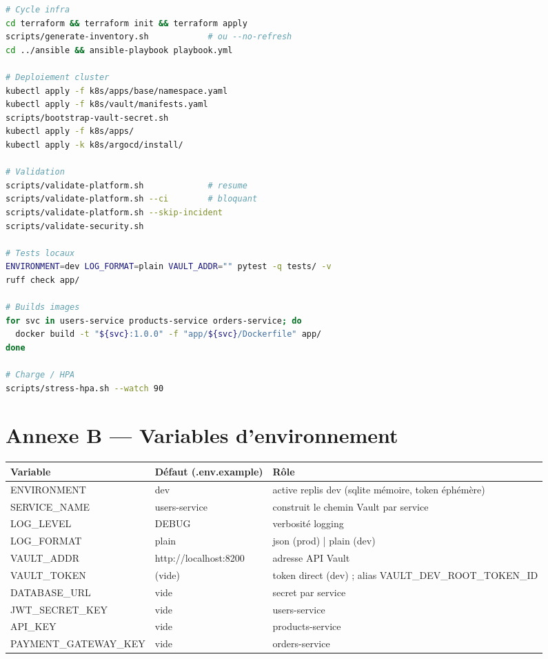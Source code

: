 \documentclass[12pt,a4paper]{article}
\begin{document}
\begin{lstlisting}[language=bash,caption={Aide-mémoire d'exploitation quotidienne}]
# Cycle infra
cd terraform && terraform init && terraform apply
scripts/generate-inventory.sh            # ou --no-refresh
cd ../ansible && ansible-playbook playbook.yml

# Deploiement cluster
kubectl apply -f k8s/apps/base/namespace.yaml
kubectl apply -f k8s/vault/manifests.yaml
scripts/bootstrap-vault-secret.sh
kubectl apply -f k8s/apps/
kubectl apply -k k8s/argocd/install/

# Validation
scripts/validate-platform.sh             # resume
scripts/validate-platform.sh --ci        # bloquant
scripts/validate-platform.sh --skip-incident
scripts/validate-security.sh

# Tests locaux
ENVIRONMENT=dev LOG_FORMAT=plain VAULT_ADDR="" pytest -q tests/ -v
ruff check app/

# Builds images
for svc in users-service products-service orders-service; do
  docker build -t "${svc}:1.0.0" -f "app/${svc}/Dockerfile" app/
done

# Charge / HPA
scripts/stress-hpa.sh --watch 90
\end{lstlisting}

\section*{Annexe B --- Variables d'environnement}

\begin{longtable}{@{}p{4.9cm}p{3.5cm}p{5.6cm}@{}}
\toprule
\textbf{Variable} & \textbf{Défaut (.env.example)} & \textbf{Rôle} \\
\midrule
\endhead
ENVIRONMENT & dev & active replis dev (sqlite mémoire, token éphémère) \\
SERVICE\_NAME & users-service & construit le chemin Vault par service \\
LOG\_LEVEL & DEBUG & verbosité logging \\
LOG\_FORMAT & plain & json (prod) | plain (dev) \\
VAULT\_ADDR & http://localhost:8200 & adresse API Vault \\
VAULT\_TOKEN & (vide) & token direct (dev) ; alias VAULT\_DEV\_\newline ROOT\_TOKEN\_ID \\
DATABASE\_URL & vide & secret par service \\
JWT\_SECRET\_KEY & vide & users-service \\
API\_KEY & vide & products-service \\
PAYMENT\_GATEWAY\_\newline KEY & vide & orders-service \\
\bottomrule
\end{longtable}
\end{document}
